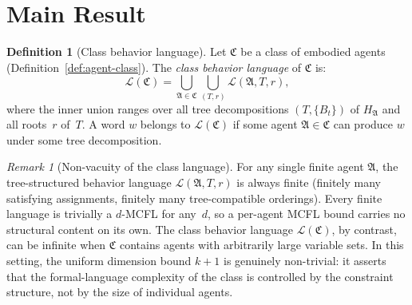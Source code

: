\documentclass[11pt,a4paper]{article}
\theoremstyle{plain}
\theoremstyle{definition}
\newtheorem{definition}[theorem]{Definition}
\theoremstyle{remark}
\newtheorem{remark}[theorem]{Remark}
\begin{document}
\section{Main Result}\label{sec:main}

\begin{definition}[Class behavior language]\label{def:class-behavior-language}
Let $\mathfrak{C}$ be a class of embodied agents (Definition~\ref{def:agent-class}).
The \emph{class behavior language} of $\mathfrak{C}$ is:
\[
  \mathcal{L}(\mathfrak{C}) = \bigcup_{\mathfrak{A} \in \mathfrak{C}} \bigcup_{(T, r)} \mathcal{L}(\mathfrak{A}, T, r),
\]
where the inner union ranges over all tree decompositions $(T, \{B_t\})$ of $H_{\mathfrak{A}}$ and all roots~$r$ of~$T$.
A word $w$ belongs to $\mathcal{L}(\mathfrak{C})$ if some agent $\mathfrak{A} \in \mathfrak{C}$ can produce $w$ under some tree decomposition.
\end{definition}

\begin{remark}[Non-vacuity of the class language]\label{rem:non-vacuity}
For any single finite agent $\mathfrak{A}$, the tree-structured behavior language $\mathcal{L}(\mathfrak{A}, T, r)$ is always finite (finitely many satisfying assignments, finitely many tree-compatible orderings).
Every finite language is trivially a $d$-MCFL for any~$d$, so a per-agent MCFL bound carries no structural content on its own.
The class behavior language $\mathcal{L}(\mathfrak{C})$, by contrast, can be infinite when $\mathfrak{C}$ contains agents with arbitrarily large variable sets.
In this setting, the uniform dimension bound $k+1$ is genuinely non-trivial: it asserts that the formal-language complexity of the class is controlled by the constraint structure, not by the size of individual agents.
\end{remark}
\end{document}
